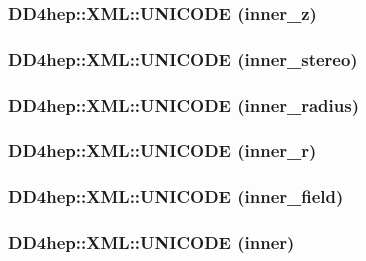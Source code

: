 \hypertarget{namespace_d_d4hep_1_1_x_m_l_aaa87719f357bec899257b32769f86ab9}{
\subsubsection[{UNICODE}]{\setlength{\rightskip}{0pt plus 5cm}DD4hep::XML::UNICODE (inner\_\-z)}}
\label{namespace_d_d4hep_1_1_x_m_l_aaa87719f357bec899257b32769f86ab9}
\hypertarget{namespace_d_d4hep_1_1_x_m_l_a39bafd71ec3133cc21736abf2e9d631a}{
\subsubsection[{UNICODE}]{\setlength{\rightskip}{0pt plus 5cm}DD4hep::XML::UNICODE (inner\_\-stereo)}}
\label{namespace_d_d4hep_1_1_x_m_l_a39bafd71ec3133cc21736abf2e9d631a}
\hypertarget{namespace_d_d4hep_1_1_x_m_l_af8394dd5806960d0d54c04be776dff7d}{
\subsubsection[{UNICODE}]{\setlength{\rightskip}{0pt plus 5cm}DD4hep::XML::UNICODE (inner\_\-radius)}}
\label{namespace_d_d4hep_1_1_x_m_l_af8394dd5806960d0d54c04be776dff7d}
\hypertarget{namespace_d_d4hep_1_1_x_m_l_a8d82a8a4d288d870a5fa27fd3190182c}{
\subsubsection[{UNICODE}]{\setlength{\rightskip}{0pt plus 5cm}DD4hep::XML::UNICODE (inner\_\-r)}}
\label{namespace_d_d4hep_1_1_x_m_l_a8d82a8a4d288d870a5fa27fd3190182c}
\hypertarget{namespace_d_d4hep_1_1_x_m_l_a03f277eadaca1de64988b99a7c69560a}{
\subsubsection[{UNICODE}]{\setlength{\rightskip}{0pt plus 5cm}DD4hep::XML::UNICODE (inner\_\-field)}}
\label{namespace_d_d4hep_1_1_x_m_l_a03f277eadaca1de64988b99a7c69560a}
\hypertarget{namespace_d_d4hep_1_1_x_m_l_a493fc42470b4fe63c1af04c9dc58823c}{
\subsubsection[{UNICODE}]{\setlength{\rightskip}{0pt plus 5cm}DD4hep::XML::UNICODE (inner)}}
